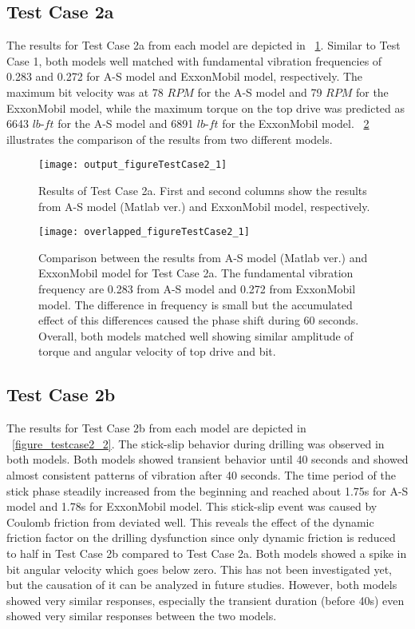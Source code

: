 \subsection{Test Case 2a}
The results for Test Case 2a from each model are depicted in \figurename~\ref{figure_testcase2_1}. Similar to Test Case 1, both models well matched with fundamental vibration frequencies of 0.283 and 0.272 for A-S model and ExxonMobil model, respectively. The maximum bit velocity was at 78 $RPM$ for the A-S model and 79 $RPM$ for the ExxonMobil model, while the maximum torque on the top drive was predicted as 6643 $lb\mbox{-}ft$ for the A-S model and 6891 $lb\mbox{-}ft$ for the ExxonMobil model. \figurename~\ref{figure_testcase2_1_overlapped} illustrates the comparison of the results from two different models. 
\begin{figure}
  \centering
  \texttt{[image: output\_figureTestCase2\_1]}
  \caption[Results of Test Case 2a]{Results of Test Case 2a. First and second columns show the results from A-S model (Matlab ver.) and ExxonMobil model, respectively.}\label{figure_testcase2_1}
\end{figure}

\begin{figure}
  \centering
  \texttt{[image: overlapped\_figureTestCase2\_1]}
  \caption[Comparison of the results for Test Case 2a]{Comparison between the results from A-S model (Matlab ver.) and ExxonMobil model for Test Case 2a. The fundamental vibration frequency are 0.283 from A-S model and 0.272 from ExxonMobil model. The difference in frequency is small but the accumulated effect of this differences caused the phase shift during 60 seconds. Overall, both models matched well showing similar amplitude of torque and angular velocity of top drive and bit.}\label{figure_testcase2_1_overlapped}
\end{figure}


\subsection{Test Case 2b}
The results for Test Case 2b from each model are depicted in \figurename~\ref{figure_testcase2_2}. The stick-slip behavior during drilling was observed in both models. Both models showed transient behavior until 40 seconds and showed almost consistent patterns of vibration after 40 seconds. The time period of the stick phase steadily increased from the beginning and reached about 1.75s for A-S model and 1.78s for ExxonMobil model. This stick-slip event was caused by Coulomb friction from deviated well. This reveals the effect of the dynamic friction factor on the drilling dysfunction since only dynamic friction is reduced to half in Test Case 2b compared to Test Case 2a. Both models showed a spike in bit angular velocity which goes below zero. This has not been investigated yet, but the causation of it can be analyzed in future studies. However, both models showed very similar responses, especially the transient duration (before 40s) even showed very similar responses between the two models.

